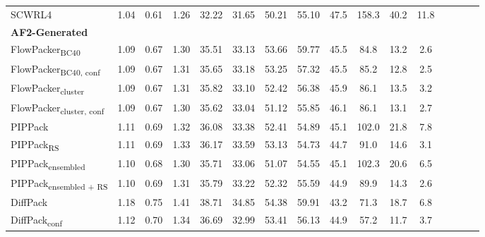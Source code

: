 \begin{table}
{\begin{tabular}{@{}lccccccccccccccc@{}}
                \textnormal{\hspace{0.5cm}SCWRL4} & 1.04 & 0.61 & 1.26 & 32.22 & 31.65 & 50.21 & 55.10 & 47.5 & 158.3 & 40.2 & 11.8 \\
            \textbf{AF2-Generated} & & & & & & & & & \\ 
                \textnormal{\hspace{0.5cm}FlowPacker\textsubscript{BC40}} & 1.09 & 0.67 & 1.30 & 35.51 & 33.13 & 53.66 & 59.77 & 45.5 & 84.8 & 13.2 & 2.6 \\
                \textnormal{\hspace{0.5cm}FlowPacker\textsubscript{BC40, conf}} & 1.09 & 0.67 & 1.31 & 35.65 & 33.18 & 53.25 & 57.32 & 45.5 & 85.2 & 12.8 & 2.5 \\
                \textnormal{\hspace{0.5cm}FlowPacker\textsubscript{cluster}} & 1.09 & 0.67 & 1.31 & 35.82 & 33.10 & 52.42 & 56.38 & 45.9 & 86.1 & 13.5 & 3.2 \\
                \textnormal{\hspace{0.5cm}FlowPacker\textsubscript{cluster, conf}} & 1.09 & 0.67 & 1.30 & 35.62 & 33.04 & 51.12 & 55.85 & 46.1 & 86.1 & 13.1 & 2.7 \\
                \textnormal{\hspace{0.5cm}PIPPack} & 1.11 & 0.69 & 1.32 & 36.08 & 33.38 & 52.41 & 54.89 & 45.1 & 102.0 & 21.8 & 7.8 \\
                \textnormal{\hspace{0.5cm}PIPPack\textsubscript{RS}} & 1.11 & 0.69 & 1.33 & 36.17 & 33.59 & 53.13 & 54.73 & 44.7 & 91.0 & 14.6 & 3.1 \\
                \textnormal{\hspace{0.5cm}PIPPack\textsubscript{ensembled}} & 1.10 & 0.68 & 1.30 & 35.71 & 33.06 & 51.07 & 54.55 & 45.1 & 102.3 & 20.6 & 6.5 \\
                \textnormal{\hspace{0.5cm}PIPPack\textsubscript{ensembled + RS}} & 1.10 & 0.69 & 1.31 & 35.79 & 33.22 & 52.32 & 55.59 & 44.9 & 89.9 & 14.3 & 2.6 \\
                \textnormal{\hspace{0.5cm}DiffPack} & 1.18 & 0.75 & 1.41 & 38.71 & 34.85 & 54.38 & 59.91 & 43.2 & 71.3 & 18.7 & 6.8 \\
                \textnormal{\hspace{0.5cm}DiffPack\textsubscript{conf}} & 1.12 & 0.70 & 1.34 & 36.69 & 32.99 & 53.41 & 56.13 & 44.9 & 57.2 & 11.7 & 3.7 \\

\end{tabular}}
\end{table}

